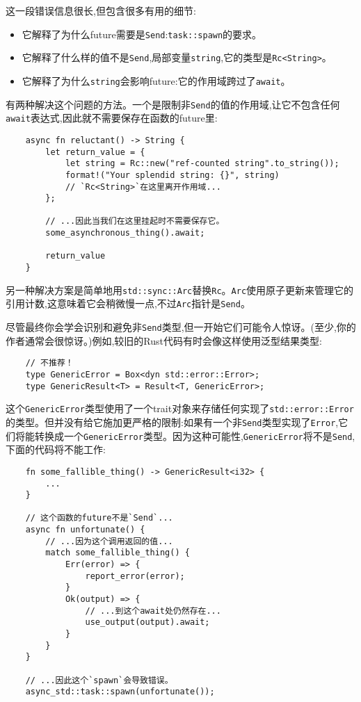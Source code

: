 这一段错误信息很长,但包含很多有用的细节:
\begin{itemize}
    \item 它解释了为什么future需要是\texttt{Send}:\texttt{task::spawn}的要求。
    \item 它解释了什么样的值不是\texttt{Send},局部变量\texttt{string},它的类型是\texttt{Rc<String>}。
    \item 它解释了为什么\texttt{string}会影响future:它的作用域跨过了\texttt{await}。
\end{itemize}

有两种解决这个问题的方法。一个是限制非\texttt{Send}的值的作用域,让它不包含任何\texttt{await}表达式,因此就不需要保存在函数的future里:
\begin{verbatim}
    async fn reluctant() -> String {
        let return_value = {
            let string = Rc::new("ref-counted string".to_string());
            format!("Your splendid string: {}", string)
            // `Rc<String>`在这里离开作用域...
        };

        // ...因此当我们在这里挂起时不需要保存它。
        some_asynchronous_thing().await;

        return_value
    }
\end{verbatim}

另一种解决方案是简单地用\texttt{std::sync::Arc}替换\texttt{Rc}。\texttt{Arc}使用原子更新来管理它的引用计数,这意味着它会稍微慢一点,不过\texttt{Arc}指针是\texttt{Send}。

尽管最终你会学会识别和避免非\texttt{Send}类型,但一开始它们可能令人惊讶。(至少,你的作者通常会很惊讶。)例如,较旧的Rust代码有时会像这样使用泛型结果类型:
\begin{verbatim}
    // 不推荐！
    type GenericError = Box<dyn std::error::Error>;
    type GenericResult<T> = Result<T, GenericError>;
\end{verbatim}

这个\texttt{GenericError}类型使用了一个trait对象来存储任何实现了\texttt{std::error::Error}的类型。但并没有给它施加更严格的限制:如果有一个非\texttt{Send}类型实现了\texttt{Error},它们将能转换成一个\texttt{GenericError}类型。因为这种可能性,\texttt{GenericError}将不是\texttt{Send},下面的代码将不能工作:
\begin{verbatim}
    fn some_fallible_thing() -> GenericResult<i32> {
        ...
    }

    // 这个函数的future不是`Send`...
    async fn unfortunate() {
        // ...因为这个调用返回的值...
        match some_fallible_thing() {
            Err(error) => {
                report_error(error);
            }
            Ok(output) => {
                // ...到这个await处仍然存在...
                use_output(output).await;
            }
        }
    }

    // ...因此这个`spawn`会导致错误。
    async_std::task::spawn(unfortunate());
\end{verbatim}

